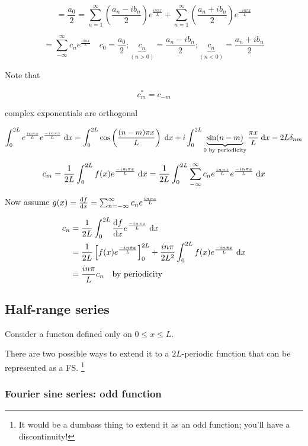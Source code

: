 \documentclass[a4paper]{article}
\begin{document}
\[ = \frac{a_{0}}{2} = \sum_{n=1}^{\infty} \left( \frac{a_{n} - i b_{n}}{2} \right) e^{\frac{i n \pi x}{L}} + \sum_{n=1}^{\infty} \left( \frac{a_{n} + i b_{n}}{2} \right) e^{\frac{- i n \pi x}{L}}  \]

\[ = \sum_{-\infty}^{\infty} c_{n} e^{\frac{i \pi n x}{L}} \quad c_{0} = \frac{a_{0}}{2} ; \underbrace{c_{n}}_{ (n > 0)} = \frac{a_{n} - i b_{n}}{2}; \underbrace{c_{n}}_{ (n < 0)} = \frac{a_{n} + i b_{n}}{2} \]

Note that 

\[ c_{m}^{*} = c_{-m} \]

complex exponentials are orthogonal

\[ \int_{0}^{2L} e^{\frac{i n \pi x}{L}} e ^{\frac{- i n \pi x}{L}} \; \mathrm{d} x = \int_{0}^{2L} \cos \left( \frac{(n - m) \pi x}{L} \right)  \; \mathrm{d} x  + i \int_{0}^{2L}  \underbrace{\sin(n-m)}_{0 \text{ by periodicity}}\frac{\pi x}{L} \; \mathrm{d} x = 2L \delta_{nm} \]


\[ c_{m} = \frac{1}{2L} \int_{0}^{2L} f(x) e^{\frac{-i m \pi x}{L}} \; \mathrm{d} x = \frac{1}{2L} \int_{0}^{2L} \sum_{-\infty}^{\infty} c_{n} e^{\frac{i n \pi x}{L}} e ^{\frac{- i n \pi x}{L}} \; \mathrm{d} x \]

Now assume $ g(x) = \frac{\mathrm{d} f}{\mathrm{d} x} = \sum_{n = -\infty}^{\infty} c_{n} e^{\frac{i n \pi x}{L}} $


\begin{align*}
	c_{n} & = \frac{1}{2L} \int_{0}^{2L} \frac{\mathrm{d} f}{\mathrm{d} x} e^{\frac{- i n \pi x}{L}} \; \mathrm{d} x \\
	& = \frac{1}{2L} \left[  f(x) e^{\frac{- i n \pi x }{L}} \right]_{0}^{2L} + \frac{i n \pi}{2L^{2}} \int_{0}^{2L} f(x) e^{\frac{- i n \pi x}{L}} \; \mathrm{d} x \\
	& = \frac{i n \pi}{L} c_{n} \quad \text{by periodicity}
\end{align*}

\subsection{Half-range series}

Consider a functon defined only on $ 0 \leq x \leq L $.

There are two possible ways to extend it to a $ 2L $-periodic function that can be represented as a FS. \footnote{It would be a dumbass thing to extend it as an odd function; you'll have a discontinuity!}

\subsubsection{Fourier sine series: odd function}
\end{document}
